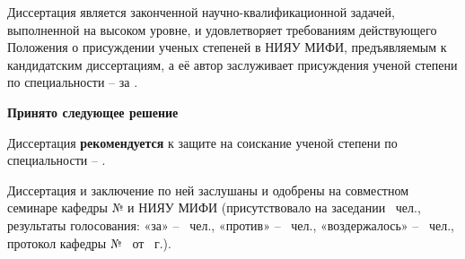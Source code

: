     Диссертация   является законченной научно-квалификационной задачей, выполненной на высоком уровне, и удовлетворяет требованиям действующего Положения о присуждении ученых степеней в НИЯУ МИФИ, предъявляемым к кандидатским диссертациям, а её автор заслуживает присуждения ученой степени  по специальности  –  за .

    \vspace{3mm}

    \textbf{Принято следующее решение}
    
    \vspace{3mm}

    Диссертация   \textbf{рекомендуется} к защите на соискание ученой степени  по специальности  – .

    Диссертация   и заключение по ней заслушаны и одобрены на совместном семинаре кафедры №  и  НИЯУ МИФИ (присутствовало на заседании \thezakltotal~чел., результаты голосования: «за» -- \thezaklyes~чел., «против» -- \thezaklno~чел., «воздержалось» -- \thezaklun~чел., протокол кафедры №~ от ~г.).


